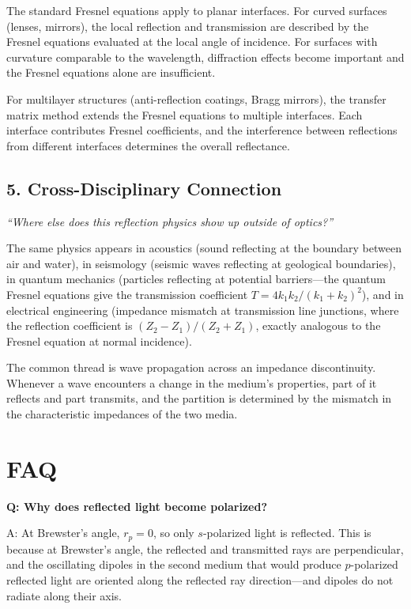 The standard Fresnel equations apply to planar interfaces. For curved surfaces (lenses, mirrors), the local reflection and transmission are described by the Fresnel equations evaluated at the local angle of incidence. For surfaces with curvature comparable to the wavelength, diffraction effects become important and the Fresnel equations alone are insufficient.

For multilayer structures (anti-reflection coatings, Bragg mirrors), the transfer matrix method extends the Fresnel equations to multiple interfaces. Each interface contributes Fresnel coefficients, and the interference between reflections from different interfaces determines the overall reflectance.

\subsection*{5. Cross-Disciplinary Connection}
\textit{``Where else does this reflection physics show up outside of optics?''}

The same physics appears in acoustics (sound reflecting at the boundary between air and water), in seismology (seismic waves reflecting at geological boundaries), in quantum mechanics (particles reflecting at potential barriers---the quantum Fresnel equations give the transmission coefficient $T = 4k_1 k_2/(k_1 + k_2)^2$), and in electrical engineering (impedance mismatch at transmission line junctions, where the reflection coefficient is $(Z_2 - Z_1)/(Z_2 + Z_1)$, exactly analogous to the Fresnel equation at normal incidence).

The common thread is wave propagation across an impedance discontinuity. Whenever a wave encounters a change in the medium's properties, part of it reflects and part transmits, and the partition is determined by the mismatch in the characteristic impedances of the two media.

\section*{FAQ}

\textbf{Q: Why does reflected light become polarized?}

A: At Brewster's angle, $r_p = 0$, so only $s$-polarized light is reflected. This is because at Brewster's angle, the reflected and transmitted rays are perpendicular, and the oscillating dipoles in the second medium that would produce $p$-polarized reflected light are oriented along the reflected ray direction---and dipoles do not radiate along their axis.

